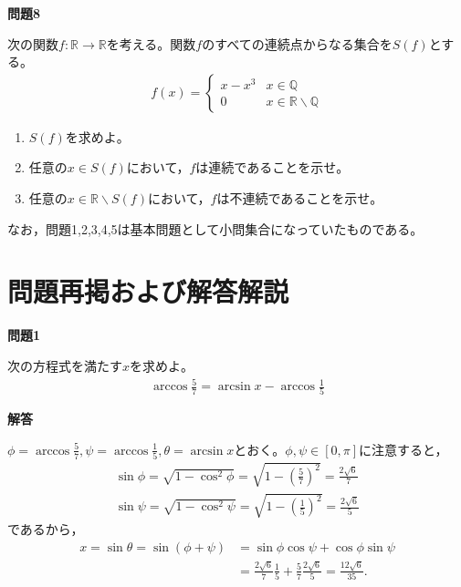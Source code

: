 \documentclass[a4paper,12pt,dvipdfmx,fleqn, oneside]{jsarticle}
\theoremstyle{defstyle}
\theoremstyle{thmx}
\theoremstyle{qesstyle}
\begin{document}
\begin{shadebox}
    \textbf{問題8}

    \text{　}次の関数$f: \mathbb{R} \rightarrow \mathbb{R}$を考える。関数$f$のすべての連続点からなる集合を$S(f)$とする。
    \begin{align*}
        f(x) =
        \begin{cases}
            x-x^3 & x \in \mathbb{Q}                       \\
            0     & x \in \mathbb{R} \backslash \mathbb{Q}
        \end{cases}
    \end{align*}
    \begin{enumerate}
        \item $S(f)$を求めよ。
        \item 任意の$x \in S(f)$において，$f$は連続であることを示せ。
        \item 任意の$x \in \mathbb{R} \backslash S(f)$において，$f$は不連続であることを示せ。
    \end{enumerate}
\end{shadebox}
なお，問題1,2,3,4,5は基本問題として小問集合になっていたものである。

\section*{問題再掲および解答解説}
\begin{shadebox}
    \textbf{問題1}

    \text{　}次の方程式を満たす$x$を求めよ。
    \begin{align*}
        \arccos \frac{5}{7} = \arcsin x- \arccos \frac{1}{5}
    \end{align*}
\end{shadebox}

\begin{screen}
    \textbf{解答}

    \text{　}$\phi = \arccos \frac{5}{7}, \psi = \arccos \frac{1}{5}, \theta = \arcsin x$とおく。$\phi , \psi \in [0, \pi]$に注意すると，
    \begin{align*}
        \sin \phi = \sqrt{1- \cos ^2 \phi }= \sqrt{1- \left(\frac{5}{7}\right)^2}=\frac{2\sqrt{6}}{7} \\
        \sin \psi = \sqrt{1- \cos ^2 \psi }= \sqrt{1-\left(\frac{1}{5}\right)^2}= \frac{2\sqrt{6}}{5}
    \end{align*}
    であるから，
    \begin{align*}
        x = \sin \theta = \sin (\phi + \psi ) & = \sin \phi \cos \psi + \cos \phi \sin \psi                                                 \\
                                              & =\frac{2\sqrt{6}}{7} \frac{1}{5} + \frac{5}{7} \frac{2\sqrt{6}}{5} = \frac{12\sqrt{6}}{35}.
    \end{align*}
\end{screen}
\end{document}
